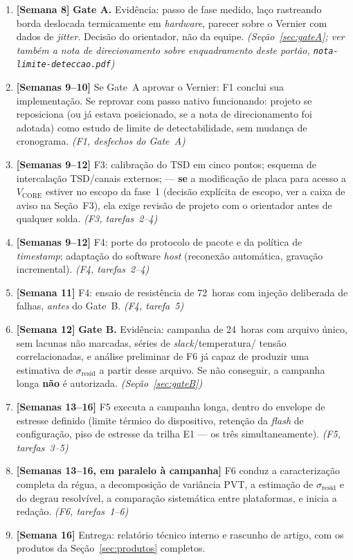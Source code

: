 \documentclass[11pt,a4paper]{article}
\begin{document}
\begin{enumerate}[leftmargin=2.4em]
        maior valor e maior risco da frente); banco de testes de simulação.
        \emph{(F1, tarefas~3--6)}
  \item \textbf{[Semana 8]} \textbf{Gate A.} Evidência: passo de fase medido, laço
        rastreando borda deslocada termicamente em \emph{hardware}, parecer sobre o
        Vernier com dados de \emph{jitter}. Decisão do orientador, não da equipe.
        \emph{(Seção~\ref{sec:gateA}; ver também a nota de direcionamento sobre
        enquadramento deste portão, \texttt{nota-limite-deteccao.pdf})}
  \item \textbf{[Semanas 9--10]} Se Gate~A aprovar o Vernier: F1 conclui sua
        implementação. Se reprovar com passo nativo funcionando: projeto se
        reposiciona (ou já estava posicionado, se a nota de direcionamento foi
        adotada) como estudo de limite de detectabilidade, sem mudança de
        cronograma. \emph{(F1, desfechos do Gate~A)}
  \item \textbf{[Semanas 9--12]} F3: calibração do TSD em cinco pontos; esquema de
        intercalação TSD/canais externos; --- \textbf{se} a modificação de placa
        para acesso a $V_\text{CORE}$ estiver no escopo da fase~1 (decisão explícita
        de escopo, ver a caixa de aviso na Seção~F3), ela exige revisão de projeto
        com o orientador antes de qualquer solda. \emph{(F3, tarefas~2--4)}
  \item \textbf{[Semanas 9--12]} F4: porte do protocolo de pacote e da política de
        \emph{timestamp}; adaptação do software \emph{host} (reconexão automática,
        gravação incremental). \emph{(F4, tarefas~2--4)}
  \item \textbf{[Semana 11]} F4: ensaio de resistência de 72~horas com injeção
        deliberada de falhas, \emph{antes} do Gate~B. \emph{(F4, tarefa~5)}
  \item \textbf{[Semana 12]} \textbf{Gate B.} Evidência: campanha de 24~horas com
        arquivo único, sem lacunas não marcadas, séries de \emph{slack}/temperatura/
        tensão correlacionadas, e análise preliminar de F6 já capaz de produzir uma
        estimativa de $\sigma_\text{resid}$ a partir desse arquivo. Se não conseguir,
        a campanha longa \textbf{não} é autorizada. \emph{(Seção~\ref{sec:gateB})}
  \item \textbf{[Semanas 13--16]} F5 executa a campanha longa, dentro do envelope de
        estresse definido (limite térmico do dispositivo, retenção da \emph{flash}
        de configuração, piso de estresse da trilha E1 --- os três simultaneamente).
        \emph{(F5, tarefas~3--5)}
  \item \textbf{[Semanas 13--16, em paralelo à campanha]} F6 conduz a caracterização
        completa da régua, a decomposição de variância PVT, a estimação de
        $\sigma_\text{resid}$ e do degrau resolvível, a comparação sistemática entre
        plataformas, e inicia a redação. \emph{(F6, tarefas~1--6)}
  \item \textbf{[Semana 16]} Entrega: relatório técnico interno e rascunho de
        artigo, com os produtos da Seção~\ref{sec:produtos} completos.
\end{enumerate}
\end{document}
